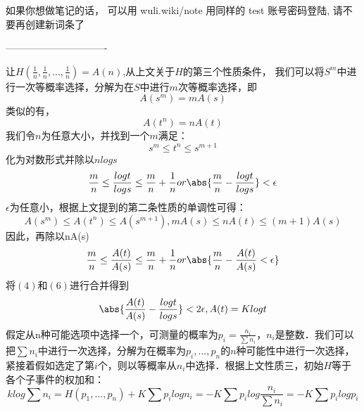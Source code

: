 
如果你想做笔记的话， 可以用 wuli.wiki/note 用同样的 test 账号密码登陆, 请不要再创建新词条了

-------------------------------

让$H(\frac{1}{n},\frac{1}{n},...,\frac{1}{n})=A(n)$,从上文关于$H$的第三个性质条件，
我们可以将$S^m$中进行一次等概率选择，分解为在$S$中进行$m$次等概率选择，即
\begin{equation}
A(s^m)=mA(s)
\end{equation}
类似的有，
\begin{equation}
A(t^n)=nA(t)
\end{equation}
我们令$n$为任意大小，并找到一个$m$满足：
\begin{equation}
s^m\leq t^n\leq s^{m+1}
\end{equation}
化为对数形式并除以$nlogs$
\begin{equation}
\frac{m}{n}\leq \frac{logt}{logs}\leq \frac{m}{n}+\frac{1}{n} or \abs{\frac{m}{n}-\frac{logt}{logs}}< \epsilon
\end{equation}
$\epsilon$为任意小，根据上文提到的第二条性质的单调性可得：
\begin{equation}
A(s^m)\leq A(t^n) \leq A(s^{m+1}), mA(s)\leq nA(t) \leq (m+1)A(s)
\end{equation}
因此，再除以nA(s)
\begin{equation}
\frac{m}{n}\leq \frac{A(t)}{A(s)}\leq \frac{m}{n}+\frac{1}{n} or \abs{\frac{m}{n} -\frac{A(t)}{A(s)} <\epsilon}
\end{equation}
将$(4)$和$(6)$进行合并得到
\begin{equation}
\abs{\frac{A(t)}{A(s)} - \frac{logt}{logs}} <2\epsilon ,A(t)=Klogt
\end{equation}
假定从n种可能选项中选择一个，可测量的概率为$p_i=\frac{n_i}{\sum n_i}$，$n_i$是整数．我们可以把$\sum{n_i}$中进行一次选择，分解为在概率为$p_i,...,p_n$的$n$种可能性中进行一次选择，紧接着假如选定了第$i$个，则以等概率从$n_i$中选择．根据上文性质三，初始$H$等于各个子事件的权加和：
\begin{equation}
klog\sum n_i=H(p_1,...,p_n)+K\sum {p_ilogn_i}=-K\sum {p_ilog\frac{n_i}{\sum n_i}}=-K\sum {p_ilogp_i}
\end{equation}
